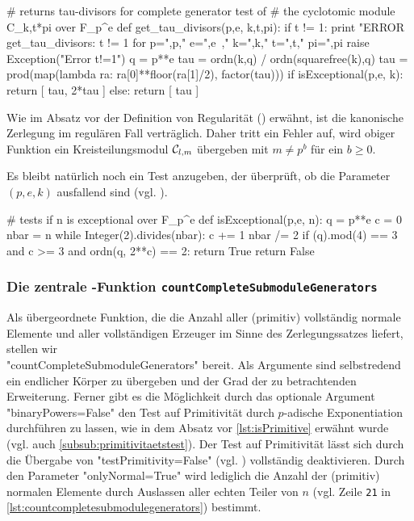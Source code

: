 \begin{sagecode}[caption={[\texttt{get\_tau\_divisors} aus 
 \url{../Sage/enumeratePCNs.spyx}]Aus \url{../Sage/enumeratePCNs.spyx}}]
# returns tau-divisors for complete generator test of 
# the cyclotomic module C_k,t*pi over F_p^e
def get_tau_divisors(p,e, k,t,pi):
    if t != 1:
        print "ERROR get_tau_divisors: t != 1 for p=",p," e=",e\
                ," k=",k," t=",t," pi=",pi
        raise Exception("Error t!=1")
    q = p**e
    tau = ordn(k,q) / ordn(squarefree(k),q)
    tau = prod(map(lambda ra: ra[0]**floor(ra[1]/2), factor(tau)))
    if isExceptional(p,e, k):
        return [ tau, 2*tau ]
    else:
        return [ tau ]
\end{sagecode}

Wie im Absatz vor der Definition von Regularität ()
erwähnt, ist die
kanonische Zerlegung im regulären Fall verträglich. Daher tritt ein Fehler auf,
wird obiger Funktion ein Kreisteilungsmodul $\mathcal{C}_{l,m}$ übergeben mit 
$m \neq p^b$ für ein $b\geq 0$.

Es bleibt natürlich noch ein Test anzugeben, der überprüft, ob 
die Parameter $(p,e,k)$ ausfallend sind (vgl. ).

\begin{sagecode}[caption={[\texttt{isExceptional} aus 
 \url{../Sage/enumeratePCNs.spyx}]Aus \url{../Sage/enumeratePCNs.spyx}}]
# tests if n is exceptional over F_p^e
def isExceptional(p,e, n):
    q = p**e
    c = 0
    nbar = n
    while Integer(2).divides(nbar):
        c += 1
        nbar /= 2
    if (q).mod(4) == 3  and c >= 3  and ordn(q, 2**c) == 2:
        return True
    return False
\end{sagecode}  


\subsubsection{Die zentrale \sage-Funktion 
  \texttt{countCompleteSubmoduleGenerators}}

Als übergeordnete Funktion, die die Anzahl aller (primitiv) vollständig
normale Elemente und aller vollständigen Erzeuger im Sinne des Zerlegungssatzes
liefert, stellen wir \\
"countCompleteSubmoduleGenerators" bereit. Als Argumente
sind selbstredend ein endlicher Körper zu übergeben und der Grad der zu
betrachtenden Erweiterung. Ferner gibt es die Möglichkeit durch das optionale
Argument "binaryPowers=False" den Test auf Primitivität durch $p$-adische
Exponentiation durchführen zu lassen, wie in dem Absatz vor 
\autoref{lst:isPrimitive} erwähnt wurde (vgl. auch 
\autoref{subsub:primitivitaetstest}). Der Test auf Primitivität lässt sich
durch die Übergabe von "testPrimitivity=False"
(vgl. ) vollständig deaktivieren.
Durch den Parameter "onlyNormal=True" wird lediglich die Anzahl der
(primitiv) normalen Elemente durch Auslassen aller echten Teiler 
von $n$ (vgl. Zeile \texttt{21} in
\autoref{lst:countcompletesubmodulegenerators}) bestimmt.

